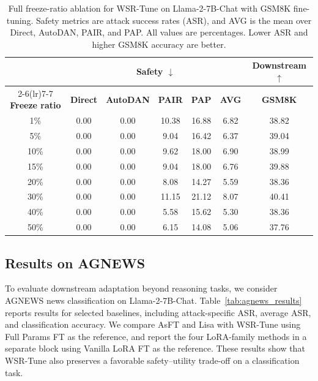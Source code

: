 \documentclass{article}
\begin{document}
\begin{table}[htbp]
\centering
\small
\caption{Full freeze-ratio ablation for WSR-Tune on Llama-2-7B-Chat with GSM8K fine-tuning. Safety metrics are attack success rates (ASR), and AVG is the mean over Direct, AutoDAN, PAIR, and PAP. All values are percentages. Lower ASR and higher GSM8K accuracy are better.}
\label{tab:keep_ratio_ablation_full}
\begin{tabular}{ccccccc}
\toprule
\textbf{} & \multicolumn{5}{c}{\textbf{Safety $\downarrow$}} & \textbf{Downstream $\uparrow$} \\
\cmidrule(lr){2-6}\cmidrule(lr){7-7}
\textbf{Freeze ratio} & \textbf{Direct} & \textbf{AutoDAN} & \textbf{PAIR} & \textbf{PAP} & \textbf{AVG} & \textbf{GSM8K} \\
\midrule
1\%  & 0.00 & 0.00 & 10.38 & 16.88 & 6.82 & 38.82 \\
5\%  & 0.00 & 0.00 & 9.04  & 16.42 & 6.37 & 39.04 \\
10\% & 0.00 & 0.00 & 9.62  & 18.00 & 6.90 & 38.99 \\
15\% & 0.00 & 0.00 & 9.04  & 18.00 & 6.76 & 39.88 \\
20\% & 0.00 & 0.00 & 8.08  & 14.27 & 5.59 & 38.36 \\
30\% & 0.00 & 0.00 & 11.15  & 21.12 & 8.07 & 40.41 \\
40\% & 0.00 & 0.00 & 5.58  & 15.62 & 5.30 & 38.36 \\
50\% & 0.00 & 0.00 & 6.15  & 14.08 & 5.06 & 37.76 \\
\bottomrule
\end{tabular}
\end{table}










\subsection{Results on AGNEWS}
\label{app:agnews_results}

To evaluate downstream adaptation beyond reasoning tasks, we consider AGNEWS news classification on Llama-2-7B-Chat. Table~\ref{tab:agnews_results} reports results for selected baselines, including attack-specific ASR, average ASR, and classification accuracy. We compare AsFT and Lisa with WSR-Tune using Full Params FT as the reference, and report the four LoRA-family methods in a separate block using Vanilla LoRA FT as the reference.
These results show that WSR-Tune also preserves a favorable safety--utility trade-off on a classification task. 
\end{document}
